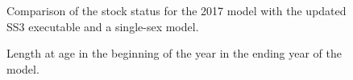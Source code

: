 \documentclass[
]{scrartcl}
\begin{document}
\begin{figure}


\caption{\label{fig-ss3exe_2}Comparison of the stock status for the 2017
model with the updated SS3 executable and a single-sex model.}

\end{figure}%

\clearpage

\begin{figure}


\caption{\label{fig-growth}Length at age in the beginning of the year in
the ending year of the model.}

\end{figure}%
\end{document}

